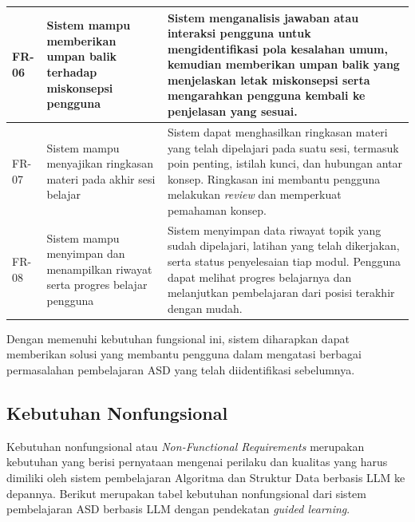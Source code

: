 \begin{longtable}{|p{1.8cm}|p{3cm}|p{7.5cm}|}
FR-06 & Sistem mampu memberikan umpan balik terhadap miskonsepsi pengguna &
Sistem menganalisis jawaban atau interaksi pengguna untuk mengidentifikasi pola kesalahan umum, kemudian memberikan umpan balik yang menjelaskan letak miskonsepsi serta mengarahkan pengguna kembali ke penjelasan yang sesuai. \\
\hline

FR-07 & Sistem mampu menyajikan ringkasan materi pada akhir sesi belajar &
Sistem dapat menghasilkan ringkasan materi yang telah dipelajari pada suatu sesi, termasuk poin penting, istilah kunci, dan hubungan antar konsep. Ringkasan ini membantu pengguna melakukan \textit{review} dan memperkuat pemahaman konsep. \\
\hline

FR-08 & Sistem mampu menyimpan dan menampilkan riwayat serta progres belajar pengguna &
Sistem menyimpan data riwayat topik yang sudah dipelajari, latihan yang telah dikerjakan, serta status penyelesaian tiap modul. Pengguna dapat melihat progres belajarnya dan melanjutkan pembelajaran dari posisi terakhir dengan mudah. \\
\hline

\end{longtable}

Dengan memenuhi kebutuhan fungsional ini, sistem diharapkan dapat memberikan solusi yang membantu pengguna dalam mengatasi berbagai permasalahan pembelajaran ASD yang telah diidentifikasi sebelumnya.


\subsection{Kebutuhan Nonfungsional}

Kebutuhan nonfungsional atau \textit{Non-Functional Requirements} merupakan kebutuhan yang berisi pernyataan mengenai perilaku dan kualitas yang harus dimiliki oleh sistem pembelajaran Algoritma dan Struktur Data berbasis LLM ke depannya. Berikut merupakan tabel kebutuhan nonfungsional dari sistem pembelajaran ASD berbasis LLM dengan pendekatan \textit{guided learning}.


